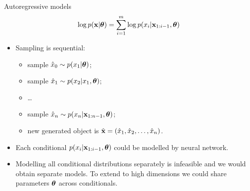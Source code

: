 \begin{frame}{Autoregressive models}
    \[
    \log p(\mathbf{x}| \boldsymbol{\theta}) = \sum_{i=1}^m \log p(x_i | \mathbf{x}_{1:i - 1}, \boldsymbol{\theta})
    \]
    \begin{itemize}
	    \item Sampling is sequential:
	    \begin{itemize}
    		\item sample $\hat{x}_0 \sim p(x_1 | \boldsymbol{\theta})$;
    		\item sample $\hat{x}_1 \sim p(x_2 | x_1, \boldsymbol{\theta})$;
    		\item \dots
    		\item sample $\hat{x}_n \sim p(x_n | \mathbf{x}_{1:n-1}, \boldsymbol{\theta})$;
    		\item new generated object is $\hat{\mathbf{x}} = (\hat{x}_1, \hat{x}_2, \dots, \hat{x}_n)$.
    	\end{itemize}
        \item Each conditional $p(x_i | \mathbf{x}_{1:i - 1}, \boldsymbol{\theta})$ could be modelled by neural network.
        \item Modelling all conditional distributions separately is infeasible and we would obtain separate models. To extend to high dimensions we could share parameters $\boldsymbol{\theta}$ across conditionals.

    \end{itemize}
\end{frame}
